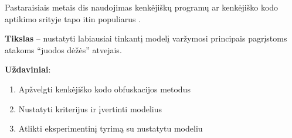
Pastaraisiais metais \acfp{di} naudojimas kenkėjiškų programų ar kenkėjiško kodo aptikimo srityje tapo itin populiarus \citeplace.

\textbf{Tikslas} -- nustatyti labiausiai tinkantį modelį varžymosi principais pagrįstoms atakoms \enquote{juodos dėžės} atvejais.

\vspace{10pt}
\textbf{Uždaviniai}:
\begin{enumerate}
    \item Apžvelgti kenkėjiško kodo obfuskacijos metodus
    \item Nustatyti kriterijus ir įvertinti modelius
    \item Atlikti eksperimentinį tyrimą su nustatytu modeliu
\end{enumerate}

